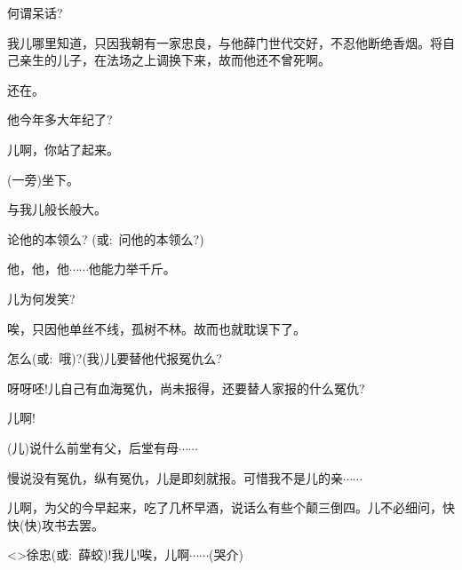 {何谓呆话?

我儿哪里知道，只因我朝有一家忠良，与他薛门世代交好，不忍他断绝香烟。将自己亲生的儿子，在法场之上调换下来，故而他还不曾死啊。

还在。

他今年多大年纪了?

儿啊，你站了起来。

(一旁)坐下。

与我儿般长般大。

论他的本领么? ({\akai 或}:~问他的本领么?)

他，他，他$\cdots{}\cdots{}$他能力举千斤。

儿为何发笑?

唉，只因他单丝不线，孤树不林。故而也就耽误下了。

怎么({\akai 或}:~哦)?(我)儿要替他代报冤仇么?

呀呀呸!儿自己有血海冤仇，尚未报得，还要替人家报的什么冤仇?

儿啊!

(儿)说什么前堂有父，后堂有母$\cdots{}\cdots{}$

慢说没有冤仇，纵有冤仇，儿是即刻就报。可惜我不是儿的亲$\cdots{}\cdots{}$

儿啊，为父的今早起来，吃了几杯早酒，说话么有些个颠三倒四。儿不必细问，快快(快)攻书去罢。


\textless{}\!\textgreater{}徐忠({\akai 或}:~薛蛟)!我儿!唉，儿啊$\cdots{}\cdots{}$({\hwfs 哭介})








}
